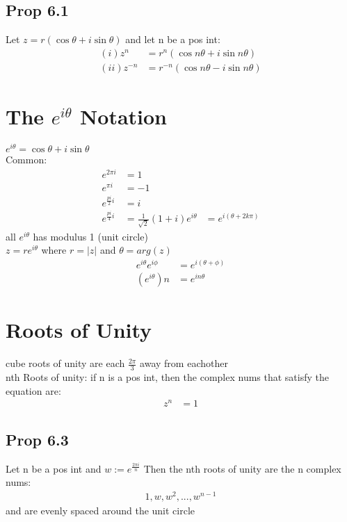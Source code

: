 \documentclass[12pt]{article}
\begin{document}
	\subsection{Prop 6.1}
		Let $ z= r(\cos\theta+i\sin\theta) $ and let n be a pos int:
		\begin{align*}
			(i) z^n &=  r^n(\cos n\theta +i\sin n\theta) \\
			(ii) z^{-n} &= r^{-n}(\cos n\theta - i\sin n\theta)
		\end{align*}
\section{The $ e^{i\theta} $ Notation }
	$ e^{i\theta} = \cos\theta + i\sin\theta $ \\
	Common:
	\begin{align*}
		e^{2\pi i} &= 1 \\
		e^{\pi i} &= -1 \\
		e^{\frac{pi}{2} i} &=  i \\
		e^{\frac{pi}{4} i} &= \frac{1}{\sqrt{2}}(1+i)
		e^{i\theta} &=  e^{i(\theta +2k\pi)}
	\end{align*}
	all $ e^{i\theta} $ has modulus 1 (unit circle) \\
	$ z= re^{i\theta} $ where $ r = |z| $ and $ \theta = arg(z) $
	\begin{align*}
		e^{i\theta}e^{i\phi} &= e^{i(\theta + \phi)}	\\
		(e^{i\theta})n &= e^{in\theta}
	\end{align*}
\section{Roots of Unity}
	cube roots of unity are each $ \frac{2\pi}{3} $ away from eachother \\
	nth Roots of unity: if n is a pos int, then the complex nums that 
	satisfy the equation are:
	\begin{align*}
		z^{n} &= 1
	\end{align*}
	\subsection{Prop 6.3}
		Let n be a pos int and $ w := e^{\frac{2\pi i}{n} } $ Then the
		nth roots of unity are the n complex nums:
		\begin{align*}
			1,w,w^2,...,w^{n-1}
		\end{align*}
		and are evenly spaced around the unit circle
\end{document}
